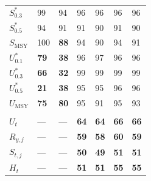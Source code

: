\documentclass[12pt,]{book}
\theoremstyle{definition}
\theoremstyle{definition}
\theoremstyle{definition}
\theoremstyle{remark}
\begin{document}
\begin{table}
\begin{tabular}[t]{lllllll}
\hspace{1em}$S^*_{0.3}$ & 99 & 94 & 96 & 96 & 96 & 96\\
\hspace{1em}$S^*_{0.5}$ & 94 & 91 & 91 & 90 & 91 & 90\\
\hspace{1em}$S_{\text{MSY}}$ & 100 & \textbf{88} & 94 & 90 & 94 & 91\\
\hspace{1em}$U^*_{0.1}$ & \textbf{79} & \textbf{38} & 96 & 97 & 96 & 96\\
\hspace{1em}$U^*_{0.3}$ & \textbf{66} & \textbf{32} & 99 & 99 & 99 & 99\\
\hspace{1em}$U^*_{0.5}$ & \textbf{21} & \textbf{38} & 95 & 95 & 96 & 96\\
\hspace{1em}$U_{\text{MSY}}$ & \textbf{75} & \textbf{80} & 95 & 91 & 95 & 93\\
\addlinespace[0.3em]
\multicolumn{7}{l}{\textbf{Abundance states}}\\
\hline
\hspace{1em}$U_{t}$ & --- & --- & \textbf{64} & \textbf{64} & \textbf{66} & \textbf{66}\\
\hspace{1em}$R_{y,j}$ & --- & --- & \textbf{59} & \textbf{58} & \textbf{60} & \textbf{59}\\
\hspace{1em}$S_{t,j}$ & --- & --- & \textbf{50} & \textbf{49} & \textbf{51} & \textbf{51}\\
\hspace{1em}$H_{t}$ & --- & --- & \textbf{51} & \textbf{51} & \textbf{55} & \textbf{55}\\
\bottomrule
\end{tabular}
\end{table}

\clearpage
\end{document}
